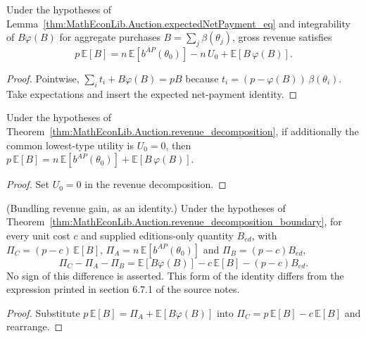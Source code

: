 \begin{theorem}\label{thm:MathEconLib.Auction.revenue_decomposition}
\leanok
{}
Under the hypotheses of Lemma~\ref{thm:MathEconLib.Auction.expectedNetPayment_eq} and integrability of $B\varphi(B)$ for aggregate purchases $B = \sum_j \beta(\theta_j)$, gross revenue satisfies
\[
  p\,\mathbb E[B] = n\,\mathbb E[b^{AP}(\theta_0)] - n\,U_0 + \mathbb E[B\,\varphi(B)].
\]
\end{theorem}
\begin{proof}
\leanok
{}
Pointwise, $\sum_i t_i + B\varphi(B) = pB$ because $t_i = (p - \varphi(B))\,\beta(\theta_i)$. Take expectations and insert the expected net-payment identity.
\end{proof}

\begin{theorem}\label{thm:MathEconLib.Auction.revenue_decomposition_boundary}
\leanok
{}
Under the hypotheses of Theorem~\ref{thm:MathEconLib.Auction.revenue_decomposition}, if additionally the common lowest-type utility is $U_0 = 0$, then $p\,\mathbb E[B] = n\,\mathbb E[b^{AP}(\theta_0)] + \mathbb E[B\,\varphi(B)]$.
\end{theorem}
\begin{proof}
\leanok
{}
Set $U_0 = 0$ in the revenue decomposition.
\end{proof}

\begin{theorem}\label{thm:MathEconLib.Auction.bundling_revenue_gain}
\leanok
{}
(Bundling revenue gain, as an identity.) Under the hypotheses of Theorem~\ref{thm:MathEconLib.Auction.revenue_decomposition_boundary}, for every unit cost $c$ and supplied editions-only quantity $B_{ed}$, with $\Pi_C = (p-c)\,\mathbb E[B]$, $\Pi_A = n\,\mathbb E[b^{AP}(\theta_0)]$ and $\Pi_B = (p-c)B_{ed}$,
\[
  \Pi_C - \Pi_A - \Pi_B = \mathbb E[B\varphi(B)] - c\,\mathbb E[B] - (p-c)B_{ed}.
\]
No sign of this difference is asserted. This form of the identity differs from the expression printed in section 6.7.1 of the source notes.
\end{theorem}
\begin{proof}
\leanok
{}
Substitute $p\,\mathbb E[B] = \Pi_A + \mathbb E[B\varphi(B)]$ into $\Pi_C = p\,\mathbb E[B] - c\,\mathbb E[B]$ and rearrange.
\end{proof}

